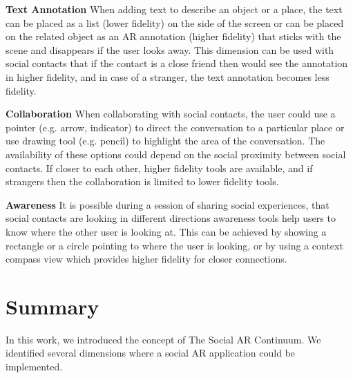 \textbf{Text Annotation}
When adding text to describe an object or a place, the text can be placed as a list (lower fidelity) on the side of the screen or can be placed on the related object as an AR annotation (higher fidelity) that sticks with the scene and disappears if the user looks away. This dimension can be used with social contacts that if the contact is a close friend then would see the annotation in higher fidelity, and in case of a stranger, the text annotation becomes less fidelity. 

\textbf{Collaboration}
When collaborating with social contacts, the user could use a pointer (e.g. arrow, indicator) to direct the conversation to a particular place or use drawing tool (e.g. pencil) to highlight the area of the conversation. The availability of these options could depend on the social proximity between social contacts. If closer to each other, higher fidelity tools are available, and if strangers then the collaboration is limited to lower fidelity tools.

\textbf{Awareness}
It is possible during a session of sharing social experiences, that social contacts are looking in different directions awareness tools help users to know where the other user is looking at. This can be achieved by showing a rectangle or a circle pointing to where the user is looking, or by using a context compass view which provides higher fidelity for closer connections.

\section{Summary}

In this work, we introduced the concept of The Social AR Continuum. We identified several dimensions where a social AR application could be implemented.
